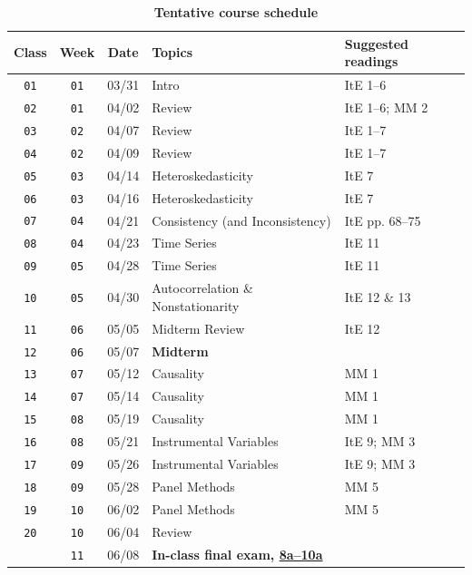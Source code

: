 \documentclass[10pt]{article}
\newcommand{\ra}[1]{\renewcommand{\arraystretch}{#1}}
\begin{document}
\begin{table}[htb]
  \centering
  \caption*{\textbf{Tentative course schedule}}
  \ra{1.5}
  \begin{tabular}{@{\extracolsep{1cm}} c c c l l @{}}
    \toprule
    Class & Week & Date & Topics & Suggested readings  \\ \toprule
      \texttt{01} & \texttt{01} & 03/31 & Intro & ItE 1--6 \\
      \texttt{02} & \texttt{01} & 04/02 & Review & ItE 1--6; MM 2 \\
      \texttt{03} & \texttt{02} & 04/07 & Review & ItE 1--7 \\
      \texttt{04} & \texttt{02} & 04/09 & Review & ItE 1--7 \\
      \texttt{05} & \texttt{03} & 04/14 & Heteroskedasticity & ItE 7 \\
      \texttt{06} & \texttt{03} & 04/16 & Heteroskedasticity & ItE 7 \\
      \texttt{07} & \texttt{04} & 04/21 & Consistency (and Inconsistency) & ItE pp. 68--75  \\
      \texttt{08} & \texttt{04} & 04/23 & Time Series & ItE 11  \\
      \texttt{09} & \texttt{05} & 04/28 & Time Series & ItE 11  \\
      \texttt{10} & \texttt{05} & 04/30 & Autocorrelation \& Nonstationarity & ItE 12 \& 13 \\
      \texttt{11} & \texttt{06} & 05/05 & Midterm Review & ItE 12 \\
      \midrule
      \texttt{12} & \texttt{06} & 05/07 & \textbf{Midterm} \\ 
      \midrule
      \texttt{13} & \texttt{07} & 05/12 & Causality & MM 1 \\ 
      \texttt{14} & \texttt{07} & 05/14 & Causality & MM 1 \\
      \texttt{15} & \texttt{08} & 05/19 & Causality & MM 1 \\
      \texttt{16} & \texttt{08} & 05/21 & Instrumental Variables & ItE 9; MM 3 \\
      \texttt{17} & \texttt{09} & 05/26 & Instrumental Variables & ItE 9; MM 3 \\
      \texttt{18} & \texttt{09} & 05/28 & Panel Methods & MM 5 \\
      \texttt{19} & \texttt{10} & 06/02 & Panel Methods & MM 5 \\
      \texttt{20} & \texttt{10} & 06/04 & Review \\
    \midrule
    \texttt{  } & \texttt{11} & 06/08 & \textbf{In-class final exam, \href{https://registrar.uoregon.edu/dates-deadlines/exams}{8a--10a}} & \\
    \bottomrule
  \end{tabular}
\end{table}
\end{document}
